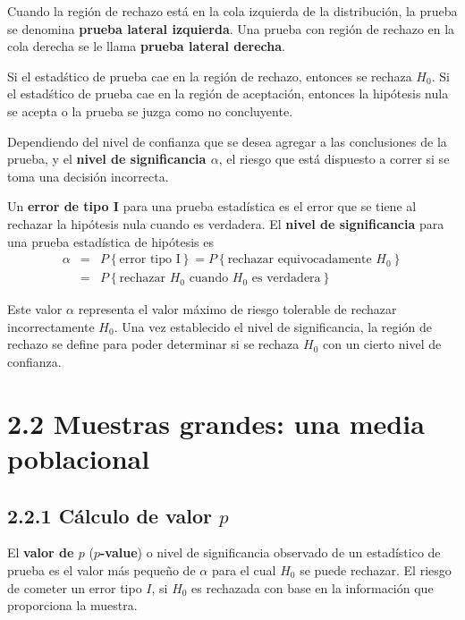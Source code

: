 \begin{frame}
\begin{frame}
Cuando la regi\'on de rechazo est\'a en la cola izquierda de la distribuci\'on, la  prueba se denomina \textbf{prueba lateral izquierda}. Una prueba con regi\'on de rechazo en la cola derecha se le llama \textbf{prueba lateral derecha}.\medskip

Si el estad\'stico de prueba cae en la regi\'on de rechazo, entonces se rechaza $H_{0}$. Si el estad\'stico de prueba cae en la regi\'on de aceptaci\'on, entonces la hip\'otesis nula se acepta o la prueba se juzga como no concluyente.\medskip

Dependiendo del nivel de confianza que se desea agregar a las conclusiones de la prueba, y el \textbf{nivel de significancia $\alpha$}, el riesgo que est\'a dispuesto a correr si se toma una decisi\'on incorrecta.






\begin{Def}
Un \textbf{error de tipo I} para una prueba estad\'istica es el error que se tiene al rechazar la hip\'otesis nula cuando es verdadera. El \textbf{nivel de significancia} para una prueba estad\'istica de hip\'otesis es
\begin{eqnarray*}
\alpha&=&P\left\{\textrm{error tipo I}\right\}=P\left\{\textrm{rechazar equivocadamente }H_{0}\right\}\\
&=&P\left\{\textrm{rechazar }H_{0}\textrm{ cuando }H_{0}\textrm{ es verdadera}\right\}
\end{eqnarray*}

\end{Def}
Este valor $\alpha$ representa el valor m\'aximo de riesgo tolerable de rechazar incorrectamente $H_{0}$. Una vez establecido el nivel de significancia, la regi\'on de rechazo se define para poder determinar si se rechaza $H_{0}$ con un cierto nivel de confianza.




\section{2.2 Muestras grandes: una media poblacional}
\subsection{2.2.1 C\'alculo de valor $p$}





\begin{Def}
El \textbf{valor de $p$} (\textbf{$p$-value}) o nivel de significancia observado de un estad\'istico de prueba es el valor m\'as peque\~ no de $\alpha$ para el cual $H_{0}$ se puede rechazar. El riesgo de cometer un error tipo $I$, si $H_{0}$ es rechazada con base en la informaci\'on que proporciona la muestra.
\end{Def}


\end{frame}
\end{frame}
